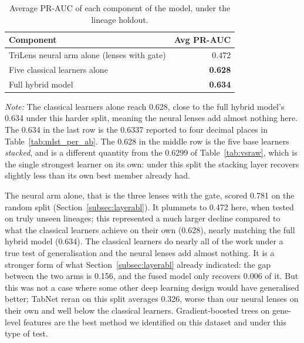\FloatBarrier
\begin{table}[htb]
\centering
\caption{Average PR-AUC of each component of the model, under the lineage
holdout.}
\label{tab:mlst_components}
\small
\begin{tabular}{|l|r|}
\hline
\textbf{Component} & \textbf{Avg PR-AUC} \\ \hline
TriLens neural arm alone (lenses with gate) & 0.472 \\ \hline
Five classical learners alone & \textbf{0.628} \\ \hline
Full hybrid model & \textbf{0.634} \\ \hline
\end{tabular}
\vspace{0.4em}

\noindent\footnotesize\textit{Note:} The classical learners alone reach 0.628, close to the full
hybrid model's 0.634 under this harder split, meaning the neural lenses add almost nothing here.
The 0.634 in the last row is the 0.6337 reported to four decimal places in
Table~\ref{tab:mlst_per_ab}. The 0.628 in the middle row is the five base
learners \emph{stacked}, and is a different quantity from the 0.6299 of
Table~\ref{tab:vsraw}, which is the single strongest learner on its own: under
this split the stacking layer recovers slightly less than its own best member
already had.
\end{table}

The neural arm alone, that is the three lenses with the gate, scored 0.781 on the
random split (Section~\ref{subsec:layerabl}). It plummets to 0.472 here, when tested on truly
unseen lineages; this represented a much larger decline compared to what the
classical learners achieve on their own (0.628), nearly matching the full hybrid
model (0.634). The classical learners do nearly all of the work under a true test
of generalisation and the neural lenses add almost nothing. It is a stronger
form of what Section~\ref{subsec:layerabl} already indicated: the gap between
the two arms is 0.156, and the fused model only
recovers 0.006 of it. But this was not a case where some other deep learning
design would have generalised better; TabNet reran on this split averages 0.326,
worse than our neural lenses on their own and well below the classical learners.
Gradient-boosted trees on gene-level features are the best method we identified
on this dataset and under this type of test.

\vspace{1em}

